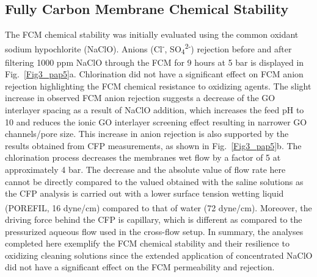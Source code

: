 \subsection{Fully Carbon Membrane Chemical Stability}
The FCM chemical stability was initially evaluated using the common oxidant sodium hypochlorite (NaClO).  Anions (Cl\textsuperscript{-}, SO\textsubscript{4}\textsuperscript{2-}) rejection before and after filtering 1000 ppm NaClO through the FCM for 9 hours at 5 bar is displayed in Fig.~\ref{Fig3_pap5}a. Chlorination did not have a significant effect on FCM anion rejection highlighting the FCM chemical resistance to oxidizing agents. The slight increase in observed FCM anion rejection suggests a decrease of the GO interlayer spacing as a result of NaClO addition, which increases the feed pH to 10 and reduces the ionic GO interlayer screening effect resulting in narrower GO channels/pore size.\cite{huang2013salt} This increase in anion rejection is also supported by the results obtained from CFP measurements, as shown in Fig.~\ref{Fig3_pap5}b. The chlorination process decreases the membranes wet flow by a factor of 5 at approximately 4 bar. The decrease and the absolute value of flow rate here cannot be directly compared to the valued obtained with the saline solutions as the CFP analysis is carried out with a lower surface tension wetting liquid (POREFIL\textsuperscript{\tiny\textregistered}, 16 dyne/cm) compared to that of water (72 dyne/cm). Moreover, the driving force behind the CFP is capillary, which is different as compared to the pressurized aqueous flow used in the cross-flow setup. In summary, the analyses completed here exemplify the FCM chemical stability and their resilience to oxidizing cleaning solutions since the extended application of concentrated NaClO did not have a significant effect on the FCM permeability and rejection.
